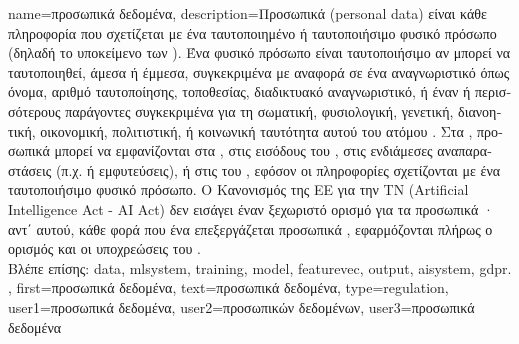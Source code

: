 {name={\foreignlanguage{greek}{προσωπικά δεδομένα}},
	description={\foreignlanguage{greek}{Προσωπικά}  (personal data) 
		\foreignlanguage{greek}{είναι κάθε πληροφορία} 
		\foreignlanguage{greek}{που σχετίζεται με ένα ταυτοποιημένο ή ταυτοποιήσιμο φυσικό
		πρόσωπο (δηλαδή το υποκείμενο των} ). \foreignlanguage{greek}{Ένα 
		φυσικό πρόσωπο είναι ταυτοποιήσιμο αν μπορεί να ταυτοποιηθεί, άμεσα ή έμμεσα, 
		συγκεκριμένα με αναφορά σε ένα αναγνωριστικό όπως όνομα, αριθμό ταυτοποίησης}, 
		 \foreignlanguage{greek}{τοποθεσίας, διαδικτυακό αναγνωριστικό, 
		ή έναν ή περισσότερους παράγοντες συγκεκριμένα για τη σωματική, φυσιολογική,
		γενετική, διανοητική, οικονομική, πολιτιστική, ή κοινωνική ταυτότητα αυτού του
		ατόμου} \cite{GDPR2016}. \foreignlanguage{greek}{Στα} , 
		\foreignlanguage{greek}{προσωπικά}  \foreignlanguage{greek}{μπορεί 
		να εμφανίζονται στα}  , 
		\foreignlanguage{greek}{στις εισόδους του} , \foreignlanguage{greek}{στις 
		ενδιάμεσες αναπαραστάσεις (π.χ.}  \foreignlanguage{greek}{ή εμφυτεύσεις),
		ή στις}  \foreignlanguage{greek}{του} , 
		\foreignlanguage{greek}{εφόσον οι πληροφορίες σχετίζονται με ένα ταυτοποιήσιμο φυσικό πρόσωπο.
		Ο Κανονισμός της ΕΕ για την ΤΝ} (Artificial Intelligence Act - AI Act) \foreignlanguage{greek}{δεν εισάγει 
		έναν ξεχωριστό ορισμό για τα προσωπικά} · \foreignlanguage{greek}{αντ΄ αυτού,
		κάθε φορά που ένα}  \foreignlanguage{greek}{επεξεργάζεται προσωπικά} , 
		\foreignlanguage{greek}{εφαρμόζονται πλήρως ο ορισμός και οι υποχρεώσεις του} . 
		\\
		\foreignlanguage{greek}{Βλέπε επίσης:} \gls{data}, \gls{mlsystem}, \gls{training}, \gls{model}, 
		\gls{featurevec}, \gls{output}, \gls{aisystem}, \gls{gdpr}. },
  	first={\foreignlanguage{greek}{προσωπικά δεδομένα}},
	text={\foreignlanguage{greek}{προσωπικά δεδομένα}},
	type=regulation,
	user1={\foreignlanguage{greek}{προσωπικά δεδομένα}}, %
	user2={\foreignlanguage{greek}{προσωπικών δεδομένων}}, %
	user3={\foreignlanguage{greek}{προσωπικά δεδομένα}} %
}

